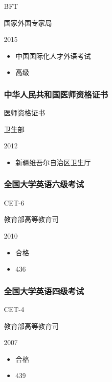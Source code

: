 \documentclass[]{article}
\providecommand{\tightlist}{%
  \setlength{\itemsep}{0pt}\setlength{\parskip}{0pt}}
\begin{document}
BFT

国家外国专家局

2015

\begin{itemize}
\tightlist
\item
  中国国际化人才外语考试
\item
  高级
\end{itemize}

\hypertarget{ux4e2dux534eux4ebaux6c11ux5171ux548cux56fdux533bux5e08ux8d44ux683cux8bc1ux4e66}{%
\subsubsection{中华人民共和国医师资格证书}\label{ux4e2dux534eux4ebaux6c11ux5171ux548cux56fdux533bux5e08ux8d44ux683cux8bc1ux4e66}}

医师资格证书

卫生部

2012

\begin{itemize}
\tightlist
\item
  新疆维吾尔自治区卫生厅
\end{itemize}

\hypertarget{ux5168ux56fdux5927ux5b66ux82f1ux8bedux516dux7ea7ux8003ux8bd5}{%
\subsubsection{全国大学英语六级考试}\label{ux5168ux56fdux5927ux5b66ux82f1ux8bedux516dux7ea7ux8003ux8bd5}}

CET-6

教育部高等教育司

2010

\begin{itemize}
\tightlist
\item
  合格
\item
  436
\end{itemize}

\hypertarget{ux5168ux56fdux5927ux5b66ux82f1ux8bedux56dbux7ea7ux8003ux8bd5}{%
\subsubsection{全国大学英语四级考试}\label{ux5168ux56fdux5927ux5b66ux82f1ux8bedux56dbux7ea7ux8003ux8bd5}}

CET-4

教育部高等教育司

2007

\begin{itemize}
\tightlist
\item
  合格
\item
  439
\end{itemize}
\end{document}
